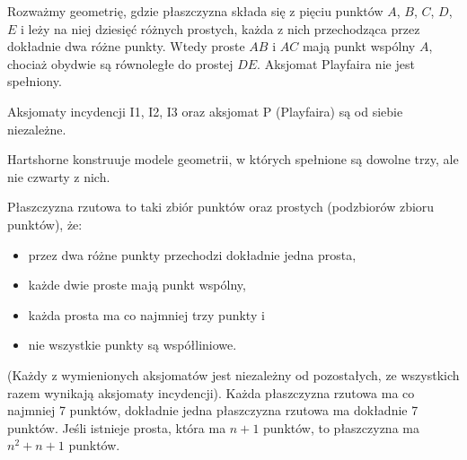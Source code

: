 \begin{example}
    Rozważmy geometrię, gdzie płaszczyzna składa się z pięciu punktów $A$, $B$, $C$, $D$, $E$ i leży na niej dziesięć różnych prostych, każda z nich przechodząca przez dokładnie dwa różne punkty.
    Wtedy proste $AB$ i $AC$ mają punkt wspólny $A$, chociaż obydwie są równoległe do prostej $DE$.
    Aksjomat Playfaira nie jest spełniony. 
\end{example}

\begin{proposition}
    Aksjomaty incydencji I1, I2, I3 oraz aksjomat P (Playfaira) są od siebie niezależne. 
\end{proposition}

Hartshorne \cite[s. 69-70]{hartshorne2000} konstruuje modele geometrii, w których spełnione są dowolne trzy, ale nie czwarty z nich.

\begin{proposition}
    Płaszczyzna rzutowa to taki zbiór punktów oraz prostych (podzbiorów zbioru punktów), że: 
    \begin{itemize}
        \item przez dwa różne punkty przechodzi dokładnie jedna prosta,
        \item każde dwie proste mają punkt wspólny,
        \item każda prosta ma co najmniej trzy punkty i
        \item nie wszystkie punkty są współliniowe.
    \end{itemize}
    (Każdy z wymienionych aksjomatów jest niezależny od pozostałych, ze wszystkich razem wynikają aksjomaty incydencji).
    Każda płaszczyzna rzutowa ma co najmniej 7 punktów, dokładnie jedna płaszczyzna rzutowa ma dokładnie 7 punktów.
    Jeśli istnieje prosta, która ma $n+1$ punktów, to płaszczyzna ma $n^2 + n + 1$ punktów.
\end{proposition} %

